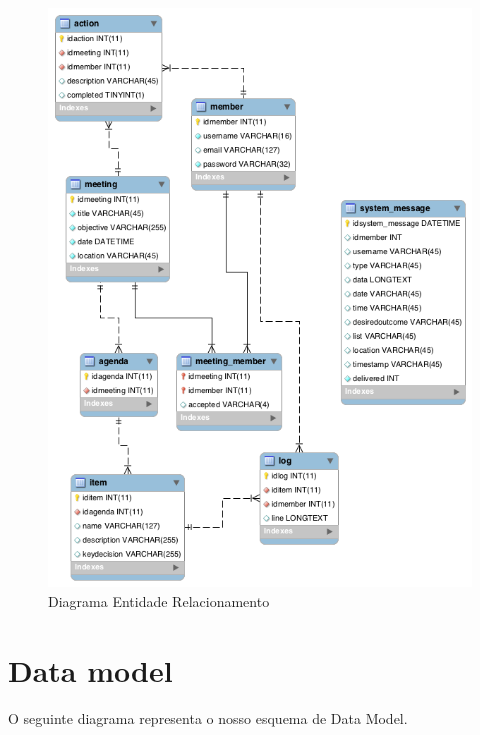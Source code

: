 \documentclass[12pt]{article} %
\begin{document}
\begin{figure}[!ht]
  	\centering
  	\includegraphics[scale=0.5]{ERdiagram.png}
  	\caption{Diagrama Entidade Relacionamento}
	\label{figure3}
\end{figure}

\-
\pagebreak


\section{Data model} %
\label{sec:data}
O seguinte diagrama representa o nosso esquema de Data Model.
\end{document}
